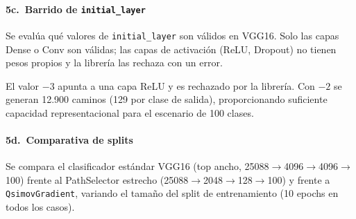 \paragraph{5c.~Barrido de \texttt{initial\_layer}}

Se evalúa qué valores de \texttt{initial\_layer} son válidos en VGG16. Solo las capas Dense o
Conv son válidas; las capas de activación (ReLU, Dropout) no tienen pesos propios y la librería
las rechaza con un error.

\begin{table}[htbp]
  \centering
  \caption{Resultados del barrido de \texttt{initial\_layer} en VGG16 (ImageNet-100).}
  \label{tab:tabla8}
\end{table}

El valor $-3$ apunta a una capa ReLU y es rechazado por la librería. Con $-2$ se generan 12.900
caminos (129 por clase de salida), proporcionando suficiente capacidad representacional para el
escenario de 100 clases.

\paragraph{5d.~Comparativa de splits}

Se compara el clasificador estándar VGG16 (top ancho, 25088$\rightarrow$4096$\rightarrow$4096$\rightarrow$100)
frente al PathSelector estrecho (25088$\rightarrow$2048$\rightarrow$128$\rightarrow$100) y frente a
\texttt{QsimovGradient}, variando el tamaño del split de entrenamiento (10 epochs en todos los casos).

\begin{table}[htbp]
  \centering
  \caption{Precisión en test según el tamaño del split de entrenamiento (ImageNet-100, GPU, 10 epochs).}
  \label{tab:tabla9}
\end{table}

